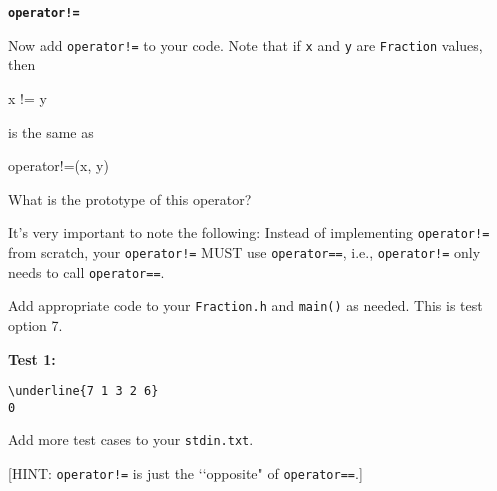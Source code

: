 \texttt{\bf operator!=}

Now add \verb~operator!=~ to your code. Note that if \verb!x! and \verb!y! are
\verb!Fraction! values, then
\begin{console}
x != y
\end{console}
is the same as
\begin{console}
operator!=(x, y)
\end{console}

What is the prototype of this operator?

It's very important to note the following: Instead of implementing
\verb~operator!=~ from scratch, your \verb~operator!=~ MUST use
\verb!operator==!, i.e., \verb~operator!=~ only needs to call
\verb!operator==!.

Add appropriate code to your \verb!Fraction.h! and \verb!main()! as needed.
This is test option 7.

\textbf{Test 1:}
\begin{Verbatim}[frame=single, commandchars=\\\{\}]
\underline{7 1 3 2 6}
0
\end{Verbatim}

Add more test cases to your \verb!stdin.txt!.

[HINT: \verb~operator!=~ is just the \lq\lq opposite" of \verb!operator==!.]
